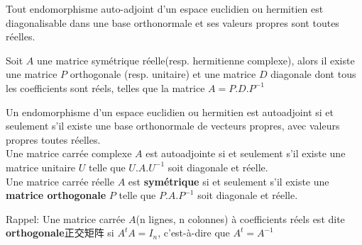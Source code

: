 \begin{theorem}
Tout endomorphisme auto-adjoint d'un espace euclidien ou hermitien est diagonalisable dans une base orthonormale et ses valeurs propres sont toutes r\'eelles.
\end{theorem}

\begin{theorem}
Soit $A$ une matrice sym\'etrique r\'eelle(resp. hermitienne complexe),
alors il existe une matrice $P$ orthogonale (resp. unitaire) et une matrice $D$ diagonale dont tous les coefficients sont r\'eels,
telles que la matrice $A = P.D.P^{-1}$
\end{theorem}

\begin{theorem}
Un endomorphisme d'un espace euclidien ou hermitien est autoadjoint
si et seulement s'il existe une base orthonormale de vecteurs propres, avec valeurs propres toutes r\'eelles.\\
Une matrice carr\'ee complexe $A$ est autoadjointe si et seulement s'il existe une matrice unitaire $U$ telle que $U.A.U^{-1}$ soit diagonale et r\'eelle.\\
Une matrice carr\'ee r\'eelle $A$ est \textbf{sym\'etrique} si et seulement s'il existe une \textbf{matrice orthogonale} $P$
telle que $P.A.P^{-1}$ soit diagonale et r\'eelle.
\end{theorem}
Rappel:
Une matrice carr\'ee $A$(n lignes, n colonnes) \`a coefficients r\'eels est dite \textbf{orthogonale}正交矩阵 si $A^t A = I_n$, c'est-\`a-dire que $A^t = A^{-1}$

